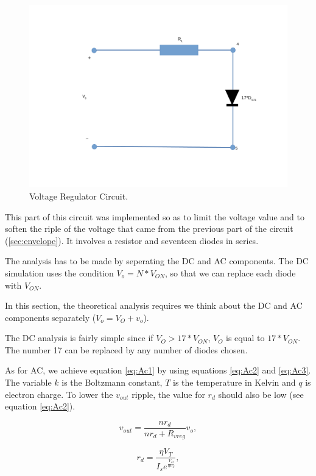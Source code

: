 \begin{figure}[h]
    \centering
    \includegraphics[scale=0.5]{voltageregulator.pdf}
    \caption{Voltage Regulator Circuit.}
    \label{fig:Regulator}
\end{figure}

This part of this circuit was implemented so as to limit the voltage value and to soften the riple of the voltage that came from the previous part of the circuit (\ref{sec:envelope}). It involves a resistor and seventeen diodes in series.


The analysis has to be made by seperating the DC and AC components. The DC simulation uses the condition $V_o=N * V_{ON}$, so that we can replace each diode with $V_{ON}$. 

In this section, the theoretical analysis requires we think about the DC and AC components separately ($V_o=V_O+v_o$). 

The DC analysis is fairly simple since if $V_O>17*V_{ON}$, $V_O$ is equal to $17*V_{ON}$. The number 17 can be replaced by any number of diodes chosen. 

As for AC, we achieve equation \ref{eq:Ac1} by using equations \ref{eq:Ac2} and \ref{eq:Ac3}. The variable $k$ is the Boltzmann constant, $T$ is the temperature in Kelvin and $q$ is electron charge. To lower the $v_{out}$ ripple, the value for $r_d$ should also be low (see equation \ref{eq:Ac2}).

\begin{equation}
    v_{out}=\frac{n r_{d}}{n r_{d} + R_{vreg}}v_o,
    \label{eq:Ac1}
\end{equation}

\begin{equation}
    r_{d}=\frac{\eta V_T}{I_s e^{\frac{V_D}{\eta V_T}}},
    \label{eq:Ac2}
\end{equation}

